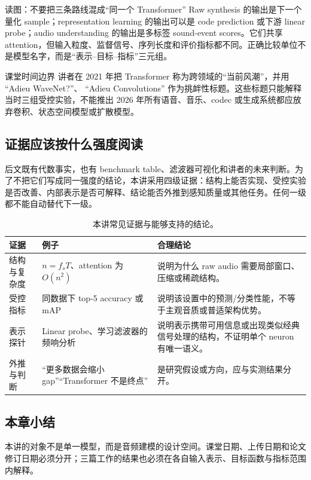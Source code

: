 \begin{knowledgebox}{读图：不要把三条路线混成“同一个 Transformer”}
Raw synthesis 的输出是下一个量化 sample；representation learning 的输出可以是 code prediction 或下游 linear probe；audio understanding 的输出是多标签 sound-event scores。它们共享 attention，但输入粒度、监督信号、序列长度和评价指标都不同。正确比较单位不是模型名字，而是“表示--目标--指标”三元组。
\end{knowledgebox}

\begin{warningbox}{课堂时间边界}
讲者在 2021 年把 Transformer 称为跨领域的“当前风潮”，并用 “Adieu WaveNet?”、 “Adieu Convolutions” 作为挑衅性标题。这些标题只能解释当时三组受控实验，不能推出 2026 年所有语音、音乐、codec 或生成系统都应放弃卷积、状态空间模型或扩散模型。
\end{warningbox}

\subsection{证据应该按什么强度阅读}

后文既有代数事实，也有 benchmark table、滤波器可视化和讲者的未来判断。为了不把它们写成同一强度的结论，本讲采用四级证据：结构上能否实现、受控实验是否改善、内部表示是否可解释、结论能否外推到感知质量或其他任务。任何一级都不能自动替代下一级。

\begin{table}[H]
\centering
\small
\caption{本讲常见证据与能够支持的结论。}
\begin{tabularx}{\textwidth}{L{0.21\textwidth}L{0.29\textwidth}X}
\toprule
证据 & 例子 & 合理结论 \\
\midrule
结构与复杂度 & $n=f_sT$、attention 为 $O(n^2)$ & 说明为什么 raw audio 需要局部窗口、压缩或稀疏结构。 \\
受控指标 & 同数据下 top-5 accuracy 或 mAP & 说明该设置中的预测/分类性能，不等于主观音质或普适架构优势。 \\
表示探针 & Linear probe、学习滤波器的频响分析 & 说明表示携带可用信息或出现类似经典信号处理的结构，不证明单个 neuron 有唯一语义。 \\
外推与判断 & “更多数据会缩小 gap”“Transformer 不是终点” & 是研究假设或方向，应与实测结果分开。 \\
\bottomrule
\end{tabularx}
\end{table}

\subsection{本章小结}

本讲的对象不是单一模型，而是音频建模的设计空间。课堂日期、上传日期和论文修订日期必须分开；三篇工作的结果也必须在各自输入表示、目标函数与指标范围内解释。

